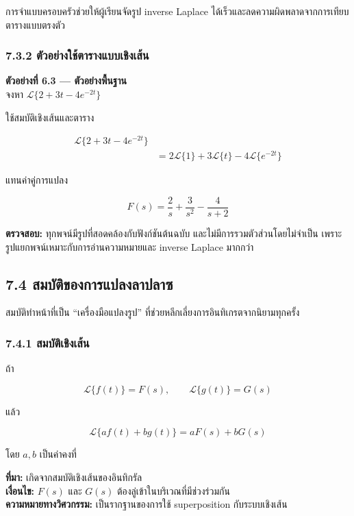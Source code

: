 การจำแบบครอบครัวช่วยให้ผู้เรียนจัดรูป inverse Laplace ได้เร็วและลดความผิดพลาดจากการเทียบตารางแบบตรงตัว

\subsubsection{7.3.2 ตัวอย่างใช้ตารางแบบเชิงเส้น}

\textbf{ตัวอย่างที่ 6.3 — ตัวอย่างพื้นฐาน}\\
จงหา $\mathcal{L}\{2+3t-4e^{-2t}\}$

ใช้สมบัติเชิงเส้นและตาราง

\[
\begin{aligned}
    \mathcal{L}\{2+3t-4e^{-2t}\}&\\
    &=2\mathcal{L}\{1\}+3\mathcal{L}\{t\}-4\mathcal{L}\{e^{-2t}\}
\end{aligned}
\]

แทนค่าคู่การแปลง

\[
\boxed{F(s)=\frac{2}{s}+\frac{3}{s^2}-\frac{4}{s+2}}
\]

\textbf{ตรวจสอบ:} ทุกพจน์มีรูปที่สอดคล้องกับฟังก์ชันต้นฉบับ และไม่มีการรวมตัวส่วนโดยไม่จำเป็น เพราะรูปแยกพจน์เหมาะกับการอ่านความหมายและ inverse Laplace มากกว่า



\subsection{7.4 สมบัติของการแปลงลาปลาซ}

สมบัติทำหน้าที่เป็น “เครื่องมือแปลงรูป” ที่ช่วยหลีกเลี่ยงการอินทิเกรตจากนิยามทุกครั้ง

\subsubsection{7.4.1 สมบัติเชิงเส้น}

ถ้า

\[
\mathcal{L}\{f(t)\}=F(s),\qquad \mathcal{L}\{g(t)\}=G(s)
\]

แล้ว

\[
\boxed{\mathcal{L}\{af(t)+bg(t)\}=aF(s)+bG(s)}
\]

โดย $a,b$ เป็นค่าคงที่

\textbf{ที่มา:} เกิดจากสมบัติเชิงเส้นของอินทิกรัล\\
\textbf{เงื่อนไข:} $F(s)$ และ $G(s)$ ต้องลู่เข้าในบริเวณที่มีช่วงร่วมกัน\\
\textbf{ความหมายทางวิศวกรรม:} เป็นรากฐานของการใช้ superposition กับระบบเชิงเส้น

